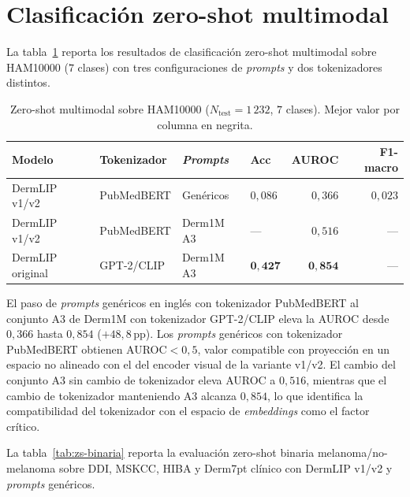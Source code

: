\section{Clasificación zero-shot multimodal}
\label{sec:zs-results}

La tabla~\ref{tab:zs-ham} reporta los resultados de clasificación
zero-shot multimodal sobre HAM10000 ($7$ clases) con tres
configuraciones de \emph{prompts} y dos tokenizadores distintos.

\begin{table}[H]
\centering
\footnotesize
\setlength{\tabcolsep}{4pt}
\renewcommand{\arraystretch}{0.95}
\caption{Zero-shot multimodal sobre HAM10000 ($N_{\mathrm{test}} = 1\,232$,
$7$ clases). Mejor valor por columna en negrita.}
\label{tab:zs-ham}
\begin{tabular}{llllrr}
\hline
Modelo                    & Tokenizador  & \emph{Prompts}     & Acc       & AUROC     & F1-macro \\
\hline
DermLIP v1/v2             & PubMedBERT   & Genéricos          & $0{,}086$ & $0{,}366$ & $0{,}023$ \\
DermLIP v1/v2             & PubMedBERT   & Derm1M A3          & ---       & $0{,}516$ & --- \\
DermLIP original          & GPT-2/CLIP   & Derm1M A3          & $\mathbf{0{,}427}$ & $\mathbf{0{,}854}$ & --- \\
\hline
\end{tabular}
\end{table}

El paso de \emph{prompts} genéricos en inglés con tokenizador
PubMedBERT al conjunto A3 de Derm1M con tokenizador GPT-2/CLIP
eleva la AUROC desde $0{,}366$ hasta $0{,}854$
($+48{,}8$\,pp). Los \emph{prompts} genéricos con tokenizador
PubMedBERT obtienen AUROC$<0{,}5$, valor compatible con proyección
en un espacio no alineado con el del encoder visual de la variante
v1/v2. El cambio del conjunto A3 sin cambio de tokenizador eleva
AUROC a $0{,}516$, mientras que el cambio de tokenizador
manteniendo A3 alcanza $0{,}854$, lo que identifica la
compatibilidad del tokenizador con el espacio de \emph{embeddings}
como el factor crítico.

La tabla~\ref{tab:zs-binaria} reporta la evaluación zero-shot binaria
melanoma/no-melanoma sobre DDI, MSKCC, HIBA y Derm7pt clínico con
DermLIP v1/v2 y \emph{prompts} genéricos.


